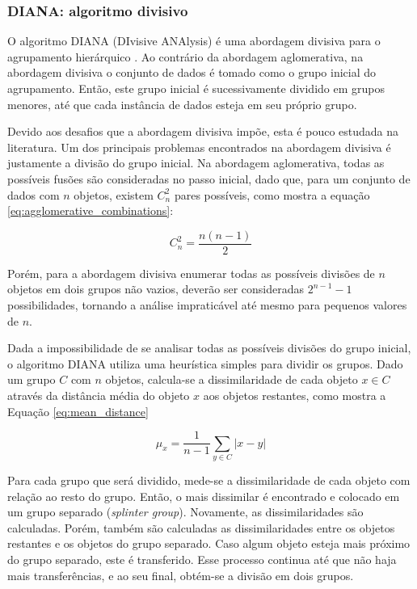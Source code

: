 \subsubsection{DIANA: algoritmo divisivo}
	\label{subsec:diana}

O algoritmo DIANA (DIvisive ANAlysis) é uma abordagem divisiva para o
agrupamento hierárquico \cite{kaufman1990finding}. Ao contrário da abordagem
aglomerativa, na abordagem divisiva o conjunto de dados é tomado como o grupo
inicial do agrupamento. Então, este grupo inicial é sucessivamente dividido em
grupos menores, até que cada instância de dados esteja em seu próprio grupo.

Devido aos desafios que a abordagem divisiva impõe, esta é pouco estudada na
literatura. Um dos principais problemas encontrados na abordagem divisiva é
justamente a divisão do grupo inicial. Na abordagem aglomerativa, todas as
possíveis fusões são consideradas no passo inicial, dado que, para um conjunto
de dados com $n$ objetos, existem $C_{n}^{2}$ pares possíveis, como mostra a
equação \ref{eq:agglomerative_combinations}:

\begin{equation}
	C_n^2 = \frac{n \left(n-1\right)}{2}
	\label{eq:agglomerative_combinations}
\end{equation}

Porém, para a abordagem divisiva enumerar todas as possíveis divisões de $n$
objetos em dois grupos não vazios, deverão ser consideradas $2^{n-1} - 1$
possibilidades, tornando a análise impraticável até mesmo para pequenos valores
de $n$.

Dada a impossibilidade de se analisar todas as possíveis divisões do grupo
inicial, o algoritmo DIANA utiliza uma heurística simples para dividir os
grupos. Dado um grupo $C$ com $n$ objetos, calcula-se a dissimilaridade de cada
objeto $x \in C$ através da distância média do objeto $x$ aos objetos restantes,
como mostra a Equação \ref{eq:mean_distance}

\begin{equation}
	\mu_x = \frac{1}{n-1} \sum_{y \in C }{\left| x - y \right|}
	\label{eq:mean_distance}
\end{equation}

Para cada grupo que será dividido, mede-se a dissimilaridade de cada
objeto com relação ao resto do grupo. Então, o mais dissimilar é encontrado
e colocado em um grupo separado (\emph{splinter group}). Novamente, as
dissimilaridades são calculadas. Porém, também são calculadas as
dissimilaridades entre os objetos restantes e os objetos do grupo separado. Caso
algum objeto esteja mais próximo do grupo separado, este é transferido. Esse
processo continua até que não haja mais transferências, e ao seu final, obtém-se
a divisão em dois grupos.

